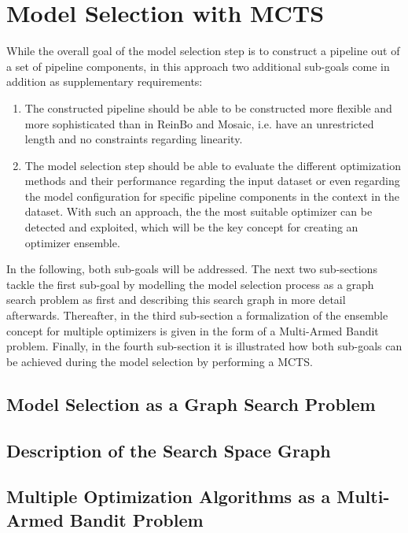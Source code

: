 \section{Model Selection with MCTS}
\label{sec:approach:selection}
While the overall goal of the model selection step is to construct a pipeline out of a set of pipeline components, in this approach two additional sub-goals come in addition as supplementary requirements:
\begin{enumerate}
    \item The constructed pipeline should be able to be constructed more flexible and more sophisticated than in ReinBo and Mosaic, i.e. have an unrestricted length and no constraints regarding linearity.
    \item The model selection step should be able to evaluate the different optimization methods and their performance regarding the input dataset or even regarding the model configuration for specific pipeline components in the context in the dataset.
    With such an approach, the the most suitable optimizer can be detected and exploited, which will be the key concept for creating an optimizer ensemble.
\end{enumerate}
In the following, both sub-goals will be addressed.
The next two sub-sections tackle the first sub-goal by modelling the model selection process as a graph search problem as first and describing this search graph in more detail afterwards.
Thereafter, in the third sub-section a formalization of the ensemble concept for multiple optimizers is given in the form of a Multi-Armed Bandit problem.
Finally, in the fourth sub-section it is illustrated how both sub-goals can be achieved during the model selection by performing a MCTS.

\subsection{Model Selection as a Graph Search Problem}
\label{sec:appraoch:selection:search}

\Blindtext

\subsection{Description of the Search Space Graph}
\label{sec:appraoch:selection:graph}

\Blindtext

\subsection{Multiple Optimization Algorithms as a Multi-Armed Bandit Problem}
\label{sec:appraoch:selection:bandit}

